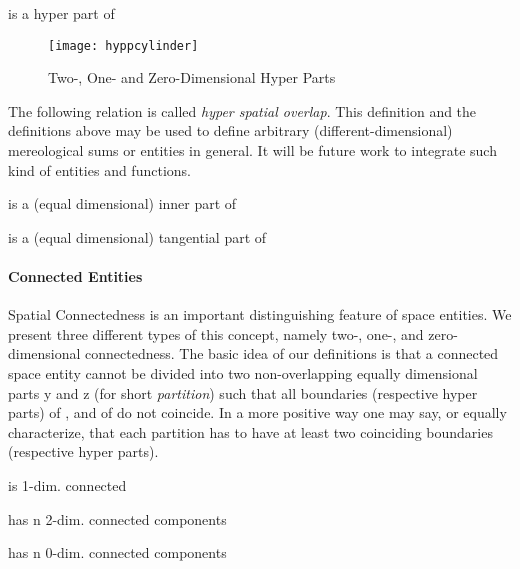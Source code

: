 \documentclass{ao2e}
\newcommand{\Gtangpart}{\ensuremath{\GSymbolFont{tangpart}}}
\newcommand{\Ginpart}{\ensuremath{\GSymbolFont{inpart}}}
\begin{document}
{\begin{enumAx}[D]
      \itemTP{\1ex] \mbox{}}
             { is a hyper part of }    
\end{enumAx}

\begin{figure}[H]
\centering
\texttt{[image: hyppcylinder]}
\caption{Two-, One- and Zero-Dimensional Hyper Parts}
\label{hypp}
\end{figure} 

The following relation is called \textit{hyper spatial overlap}. This definition and the definitions above may be used to define arbitrary (different-dimensional) mereological sums or entities in general. It will be future work to integrate such kind of entities and functions.

\begin{enumAx}[D]  
      \itemTP{\1ex] \mbox{}}
             { is a (equal dimensional) inner part of }   
             
\itemT{\Gtangpart(x,y) \Ldef \Gspart(x,y) \wedge \neg\Ginpart(x,y)}
             { is a (equal dimensional) tangential part of }                     

\end{enumAx}
\paragraph{Connected Entities}  

Spatial Connectedness is an important distinguishing feature of space entities. We present three different types of this concept, namely two-, one-, and zero-dimensional connectedness. The basic idea of our definitions is that a connected space entity  cannot be divided into two non-overlapping equally dimensional parts y and z (for short \textit{partition}) such that all boundaries (respective hyper parts)  of , and  of  do not coincide. In a more positive way one may say, or equally characterize, that each partition has to have at least two coinciding boundaries (respective hyper parts). 
\begin{enumAx}[D]

             
\itemTP{\1ex] \mbox{}}
             { is 1-dim. connected} 
             
\itemTP{\1ex] \mbox{}}
             { has n 2-dim. connected components} 
             
\itemTP{\1ex] \mbox{}}
             { has n 0-dim. connected components}                           
                             
\end{enumAx}

}
\end{document}
